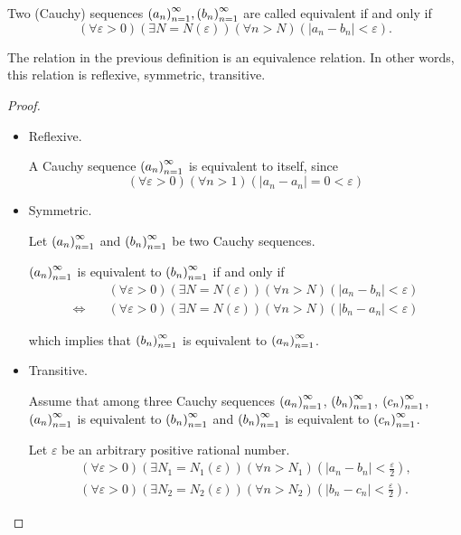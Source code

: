 \begin{definition}
    Two (Cauchy) sequences ${\left({a_{n}}\right)}^{\infty}_{n=1}, {\left({b_{n}}\right)}^{\infty}_{n=1}$ are called equivalent if and only if
    \[
        (\forall\varepsilon > 0)(\exists N=N(\varepsilon))(\forall n > N)(\left\vert a_{n} - b_{n} \right\vert < \varepsilon).
    \]
\end{definition}

\begin{theorem}
    The relation in the previous definition is an equivalence relation. In other words, this relation is reflexive, symmetric, transitive.
\end{theorem}

\begin{proof}
    \begin{itemize}
        \item Reflexive.

              A Cauchy sequence ${\left({a_{n}}\right)}^{\infty}_{n=1}$ is equivalent to itself, since
              \[
                  (\forall\varepsilon > 0)(\forall n > 1)(\left\vert a_{n} - a_{n} \right\vert = 0 < \varepsilon)
              \]
        \item Symmetric.

              Let ${\left({a_{n}}\right)}^{\infty}_{n=1}$ and ${\left({b_{n}}\right)}^{\infty}_{n=1}$ be two Cauchy sequences.

              ${\left({a_{n}}\right)}^{\infty}_{n=1}$ is equivalent to ${\left({b_{n}}\right)}^{\infty}_{n=1}$ if and only if
              \[
                  \begin{split}
                      & (\forall\varepsilon > 0)(\exists N=N(\varepsilon))(\forall n > N)(\left\vert a_{n} - b_{n} \right\vert < \varepsilon) \\
                      \Leftrightarrow\quad & (\forall\varepsilon > 0)(\exists N=N(\varepsilon))(\forall n > N)(\left\vert b_{n} - a_{n} \right\vert < \varepsilon)
                  \end{split}
              \]

              which implies that ${\left({b_{n}}\right)}^{\infty}_{n=1}$ is equivalent to ${\left({a_{n}}\right)}^{\infty}_{n=1}$.
        \item Transitive.

              Assume that among three Cauchy sequences ${\left({a_{n}}\right)}^{\infty}_{n=1}$, ${\left({b_{n}}\right)}^{\infty}_{n=1}$, ${\left({c_{n}}\right)}^{\infty}_{n=1}$, ${\left({a_{n}}\right)}^{\infty}_{n=1}$ is equivalent to ${\left({b_{n}}\right)}^{\infty}_{n=1}$ and ${\left({b_{n}}\right)}^{\infty}_{n=1}$ is equivalent to ${\left({c_{n}}\right)}^{\infty}_{n=1}$.

              Let $\varepsilon$ be an arbitrary positive rational number.
              \[
                  \begin{split}
                      (\forall\varepsilon > 0)(\exists N_{1}=N_{1}(\varepsilon))(\forall n > N_{1})\left(\left\vert a_{n} - b_{n} \right\vert < \frac{\varepsilon}{2}\right), \\
                      (\forall\varepsilon > 0)(\exists N_{2}=N_{2}(\varepsilon))(\forall n > N_{2})\left(\left\vert b_{n} - c_{n} \right\vert < \frac{\varepsilon}{2}\right).
                  \end{split}
              \]


\end{itemize}
\end{proof}
